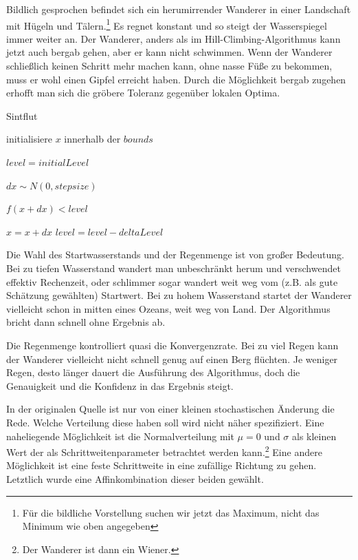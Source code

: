 \documentclass[a4paper,12pt]{article}
\begin{document}
Bildlich gesprochen befindet sich ein herumirrender Wanderer in einer Landschaft mit Hügeln und Tälern.\footnote{Für die bildliche Vorstellung suchen wir jetzt das Maximum, nicht das Minimum wie oben angegeben} Es regnet konstant und so steigt der Wasserspiegel immer weiter an. Der Wanderer, anders als im Hill-Climbing-Algorithmus kann jetzt auch bergab gehen, aber er kann nicht schwimmen. Wenn der Wanderer schließlich keinen Schritt mehr machen kann, ohne nasse Füße zu bekommen, muss er wohl einen Gipfel erreicht haben. Durch die Möglichkeit bergab zugehen erhofft man sich die gröbere Toleranz gegenüber lokalen Optima.

\begin{algorithm}
\caption{Sintflut}
\begin{algorithmic}

\State initialisiere $x$ innerhalb der $bounds$

\State $level = initialLevel$


	$dx \sim N(0, stepsize)$

	\If $f(x + dx) < level$
	
		\State $x = x + dx$
		\State $level = level - deltaLevel$
	\EndIf

\EndFor

\EndFunction	
\end{algorithmic}
\end{algorithm}

Die Wahl des Startwasserstands und der Regenmenge ist von großer Bedeutung. Bei zu tiefen Wasserstand wandert man unbeschränkt herum und verschwendet effektiv Rechenzeit, oder schlimmer sogar wandert weit weg vom (z.B. als gute Schätzung gewählten) Startwert. Bei zu hohem Wasserstand startet der Wanderer vielleicht schon in mitten eines Ozeans, weit weg von Land. Der Algorithmus bricht dann schnell ohne Ergebnis ab.

Die Regenmenge kontrolliert quasi die Konvergenzrate. Bei zu viel Regen kann der Wanderer vielleicht nicht schnell genug auf einen Berg flüchten. Je weniger Regen, desto länger dauert die Ausführung des Algorithmus, doch die Genauigkeit und die Konfidenz in das Ergebnis steigt.

In der originalen Quelle ist nur von einer kleinen stochastischen Änderung die Rede. Welche Verteilung diese haben soll wird nicht näher spezifiziert. Eine naheliegende Möglichkeit ist die Normalverteilung mit $\mu = 0$ und $\sigma$ als kleinen Wert der als Schrittweitenparameter betrachtet werden kann.\footnote{Der Wanderer ist dann ein Wiener.} Eine andere Möglichkeit ist eine feste Schrittweite in eine zufällige Richtung zu gehen. Letztlich wurde eine Affinkombination dieser beiden gewählt. 
\end{document}
